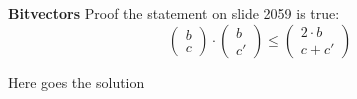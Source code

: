 \question \textbf{Bitvectors}
Proof the statement on slide 2059 is true:
\begin{equation}
\begin{pmatrix}
b\\c
\end{pmatrix}
\cdot
\begin{pmatrix}
b\\c'
\end{pmatrix}
\leq
\begin{pmatrix}
2\cdot b\\c + c'
\end{pmatrix}
\end{equation}



\begin{solution}
Here goes the solution
\end{solution}